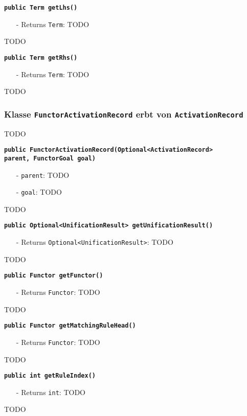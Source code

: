 \documentclass[parskip=full,11pt,twoside]{scrartcl}
\begin{document}
\textbf{\texttt{public Term getLhs()}}
\begin{itemize}[noitemsep]
	\item[-] Returns \texttt{Term}: TODO
\end{itemize}
TODO

\textbf{\texttt{public Term getRhs()}}
\begin{itemize}[noitemsep]
	\item[-] Returns \texttt{Term}: TODO
\end{itemize}
TODO

\subsubsection{Klasse \texttt{FunctorActivationRecord} erbt von \texttt{ActivationRecord}}
TODO

\textbf{\texttt{public FunctorActivationRecord(Optional<ActivationRecord>\\ parent, FunctorGoal goal)}}
\begin{itemize}[noitemsep]
	\item[-] \texttt{parent}: TODO
	\item[-] \texttt{goal}: TODO
\end{itemize}
TODO

\textbf{\texttt{public Optional<UnificationResult> getUnificationResult()}}
\begin{itemize}[noitemsep]
	\item[-] Returns \texttt{Optional<UnificationResult>}: TODO
\end{itemize}
TODO

\textbf{\texttt{public Functor getFunctor()}}
\begin{itemize}[noitemsep]
	\item[-] Returns \texttt{Functor}: TODO
\end{itemize}
TODO

\textbf{\texttt{public Functor getMatchingRuleHead()}}
\begin{itemize}[noitemsep]
	\item[-] Returns \texttt{Functor}: TODO
\end{itemize}
TODO

\textbf{\texttt{public int getRuleIndex()}}
\begin{itemize}[noitemsep]
	\item[-] Returns \texttt{int}: TODO
\end{itemize}
TODO
\end{document}

